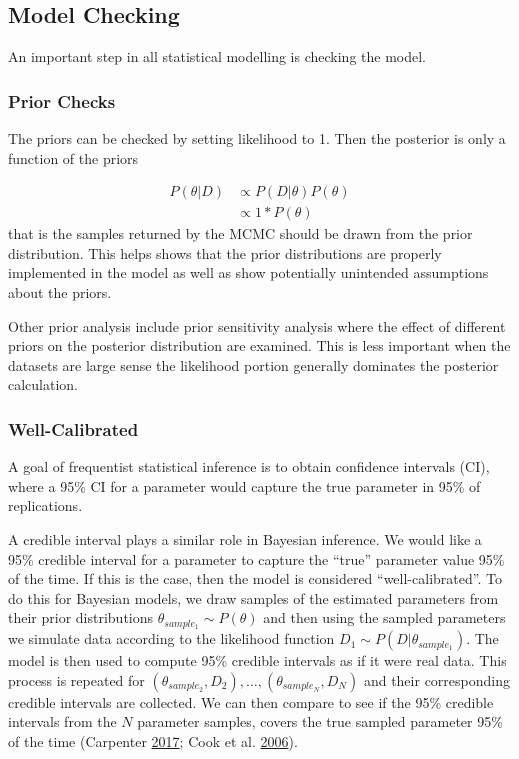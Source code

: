 \documentclass[11pt,a4paper]{article}
\numberwithin{equation}{section}
\begin{document}
\hypertarget{model-checking}{%
\subsection{Model Checking}\label{model-checking}}
An important step in all statistical modelling is checking the model.

\hypertarget{prior-checks}{%
\subsubsection{Prior Checks}\label{prior-checks}}

The priors can be checked by setting likelihood to 1. Then the posterior
is only a function of the priors

\[\begin{aligned} P(\theta|D) & \propto P(D|\theta)P(\theta) \\ & \propto 1*P(\theta)  \end{aligned} \]
that is the samples returned by the MCMC should be drawn from the prior
distribution. This helps shows that the prior distributions are properly
implemented in the model as well as show potentially unintended
assumptions about the priors.

Other prior analysis include prior sensitivity analysis where the effect
of different priors on the posterior distribution are examined. This is
less important when the datasets are large sense the likelihood portion
generally dominates the posterior calculation.

\hypertarget{well-calibrated}{%
\subsubsection{Well-Calibrated}\label{well-calibrated}}

A goal of frequentist statistical inference is to obtain confidence
intervals (CI), where a 95\% CI for a parameter would capture the true
parameter in 95\% of replications.

A credible interval plays a similar role in Bayesian inference. We would
like a 95\% credible interval for a parameter to capture the ``true''
parameter value 95\% of the time. If this is the case, then the model is
considered ``well-calibrated''. To do this for Bayesian models, we draw
samples of the estimated parameters from their prior distributions
\(\theta_{sample_1} \sim P(\theta)\) and then using the sampled
parameters we simulate data according to the likelihood function
\(D_{1} \sim P(D|\theta_{sample_1})\). The model is then used to compute
95\% credible intervals as if it were real data. This process is
repeated for
\((\theta_{sample_2}, D_2), \dots, (\theta_{sample_N}, D_N)\) and their
corresponding credible intervals are collected. We can then compare to
see if the 95\% credible intervals from the \(N\) parameter samples,
covers the true sampled parameter 95\% of the time (Carpenter
\protect\hyperlink{ref-carpenter_bayesian_2017}{2017}; Cook et al.
\protect\hyperlink{ref-cook_validation_2006}{2006}).
\end{document}
